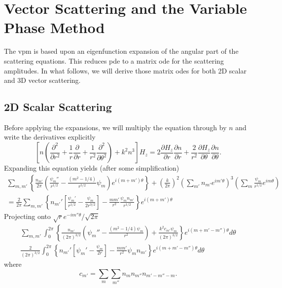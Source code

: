 \section{Vector Scattering and the Variable Phase Method}\label{sec:app.basisEqn.vpm}
The \gls{vpm} is based upon an eigenfunction expansion of the 
angular part of the scattering equations. This reduces \gls{pde}
to a matrix \gls{ode} for the scattering amplitudes. In what
follows, we will derive those matrix \glspl{ode} for both 
2D scalar and 3D vector scattering. 

\subsection{2D Scalar Scattering}
Before applying the expansions, we will multiply the equation through 
by $n$ and write the derivatives explicitly
  \begin{equation}
    \left[n\left(\frac{\partial^2}{\partial r^2}+\frac{1}{r}\frac{\partial}{\partial r}+\frac{1}{r^2}\frac{\partial^2}{\partial\theta^2}\right)+k^2n^3\right]H_z
    =
    2\frac{\partial H_z}{\partial r}\frac{\partial n}{\partial r}+\frac{2}{r^2}\frac{\partial H_z}{\partial\theta}\frac{\partial n}{\partial\theta}.
  \end{equation}
Expanding this equation yields (after some simplification)
  \begin{multline}
   \sum_{m,m'}
    \left\{\frac{n_{m'}}{2\pi}\left(\frac{\psi_{m}''}{r^{1/2}}-\frac{(m^2-1/4)}{r^{5/2}}\psi_m\right)e^{i(m+m')\theta}\right\}
	+\left(\frac{k}{2\pi}\right)^2\left(\sum_{m'}n_{m'}e^{im'\theta}\right)^3\left(\sum_m\frac{\psi_m}{r^{1/2}}e^{im\theta}\right)\\
	=\frac{2}{2\pi}\sum_{m,m'}\left\{n_{m'}'\left[\frac{\psi_m'}{r^{1/2}}-\frac{\psi_m}{2r^{3/2}}\right]-\frac{mm'}{r^2}\frac{\psi_mn_{m'}}{r^{1/2}}\right\}e^{i(m+m')\theta}
  \end{multline}
Projecting onto $\sqrt{r}e^{-im''\theta}/\sqrt{2\pi}$
  \begin{multline}
    \sum_{m,m'}\int_0^{2\pi}\left\{\frac{n_{m'}}{(2\pi)^{3/2}}\left(\psi_m''-\frac{(m^2-1/4)\psi_m}{r^2}\right)+\frac{k^2c_{m'}\psi_m}{(2\pi)^{3/2}}\right\}e^{i(m+m'-m'')\theta}d\theta\\
    \frac{2}{(2\pi)^{3/2}}\int_0^{2\pi}\left\{n_{m'}'\left[\psi_m'-\frac{\psi_m}{2r}\right]-\frac{mm'}{r^2}\psi_mn_{m'}\right\}e^{i(m+m'-m'')\theta}d\theta
  \end{multline}
where
  \begin{equation}
   c_{m'} = \sum_{m}\sum_{m''}n_mn_{m''}n_{m'-m''-m}.
  \end{equation}
